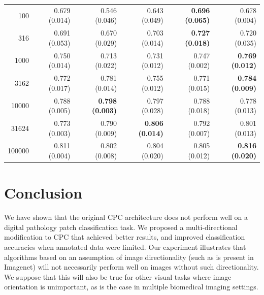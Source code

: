 \begin{table}[]
{\begin{tabular}{r|rrrrr}
			100    & 0.679 (0.014) & 0.546 (0.046)          & 0.643 (0.049)          & \textbf{0.696 (0.065)} & 0.678 (0.004)          \\
			316    & 0.691 (0.053) & 0.670 (0.029)          & 0.703 (0.014)          & \textbf{0.727 (0.018)} & 0.720 (0.035)          \\
			1000   & 0.750 (0.014) & 0.713 (0.022)          & 0.731 (0.012)          & 0.747 (0.002)          & \textbf{0.769 (0.012)} \\
			3162   & 0.772 (0.017) & 0.781 (0.014)          & 0.755 (0.012)          & 0.771 (0.015)          & \textbf{0.784 (0.009)} \\
			10000  & 0.788 (0.005) & \textbf{0.798 (0.003)} & 0.797 (0.028)          & 0.788 (0.018)          & 0.778 (0.013)          \\
			31624  & 0.773 (0.003) & 0.790 (0.009)          & \textbf{0.806 (0.014)} & 0.792 (0.007)          & 0.801 (0.013)          \\
			100000 & 0.811 (0.004) & 0.802 (0.008)          & 0.804 (0.020)          & 0.805 (0.012)          & \textbf{0.816 (0.020)}
		\end{tabular}%
	}
\end{table}


\section{Conclusion}
We have shown that the original CPC architecture does not perform well on a digital pathology patch classification task. We proposed a multi-directional modification to CPC that achieved better results, and improved classification accuracies when annotated data were limited. Our experiment illustrates that algorithms based on an assumption of image directionality (such as is present in Imagenet) will not necessarily perform well on images without such directionality. We suppose that this will also be true for other visual tasks where image orientation is unimportant, as is the case in multiple biomedical imaging settings.  